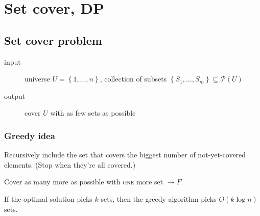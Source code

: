 \chapter{Set cover, DP}
\section{Set cover problem}
\begin{description}
	\item[input] 
		universe
		\(U = \left\{1, \ldots, n\right\}\),
		collection of subsets
		\(\left\{S_1, \ldots, S_m\right\} \subseteq \mathscr{P}(U)\)
	\item[output] cover \(U\) with as few sets as possible
\end{description}

\subsection{Greedy idea}
Recursively include the set that covers the biggest number of not-yet-covered elements. (Stop when they're all covered.)
\begin{algorithmic}[1]
		\State Cover as many more as possible with \textsc{one} more set \(\to F\).
	\EndWhile
\end{algorithmic}
%	
\begin{theorem}
	If the optimal solution picks \(k\) sets, then the greedy algorithm picks \(O(k\log n)\) sets.
\end{theorem}
